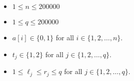\begin{itemize}
\item $1\le n \le 200000$
\item $1\le q \le 200000$
\item $a[i]\in\{0,1\}$ for all $i\in \{1,2,\dots,n\}$.
\item $t_j\in\{1,2\}$ for all $j\in \{1,2,\dots,q\}$.
\item $1\le \ell_j \le r_j \le q$ for all $j\in \{1,2,\dots,q\}$.
\end{itemize}

